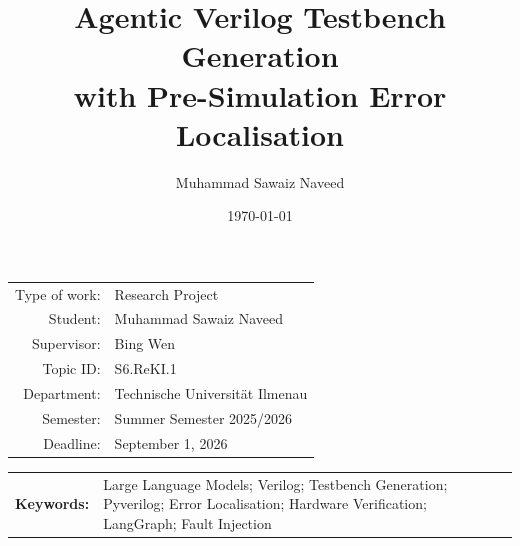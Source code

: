 \documentclass[11pt,a4paper,titlepage=false]{scrreprt}
\begin{document}


\title{Agentic Verilog Testbench Generation\\with Pre-Simulation Error Localisation}
\author{Muhammad Sawaiz Naveed}
\date{\today}
\maketitle

\vspace{0.5cm}

\begin{tabular}{r l}
Type of work: & Research Project \\
Student:      & Muhammad Sawaiz Naveed \\
Supervisor:   & Bing Wen \\
Topic ID:     & S6.ReKI.1 \\
Department:   & Technische Universität Ilmenau \\
Semester:     & Summer Semester 2025/2026 \\
Deadline:     & September 1, 2026 \\
\end{tabular}

\vspace{4mm}

\begin{tabular}{l p{}}
\textbf{Keywords:} & Large Language Models; Verilog; Testbench Generation; Pyverilog;
Error Localisation; Hardware Verification; LangGraph; Fault Injection \\
\end{tabular}

\vspace{8mm}
\end{document}
